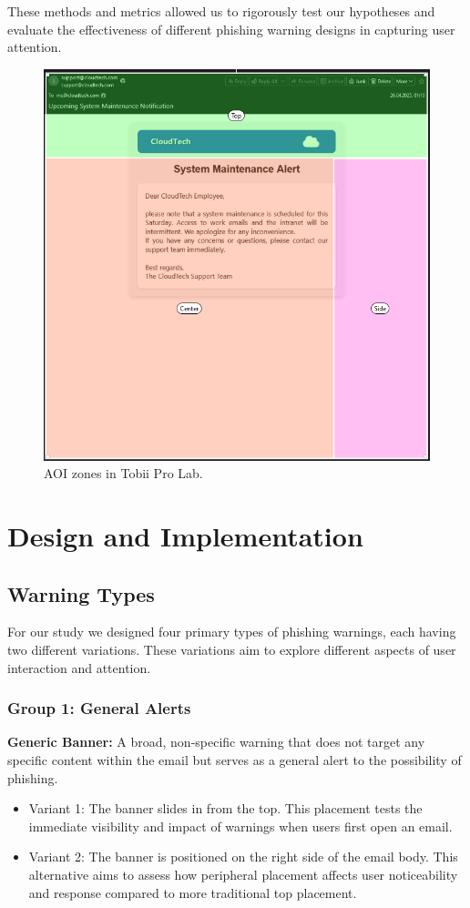 \documentclass[
  a4paper,  %
  twoside,  %
  bibliography=totoc,
  headsepline,
  cleardoublepage=empty,
  parskip=half,
  draft=false
]{scrbook}
\begin{document}
These methods and metrics allowed us to rigorously test our hypotheses and evaluate the effectiveness of different phishing warning designs in capturing user attention.

\begin{figure} [ht]
    \centering
    \includegraphics[width=0.7\linewidth]{figures/aoi.png}
    \caption{AOI zones in Tobii Pro Lab.}
    \label{fig:aoi}
\end{figure}

\chapter{Design and Implementation}
\label{implementation}

\section{Warning Types}
\label{types}
For our study we designed four primary types of phishing warnings, each having two different variations. These variations aim to explore different aspects of user interaction and attention.

\subsection{Group 1: General Alerts}

\textbf{Generic Banner:} A broad, non-specific warning that does not target any specific content within the email but serves as a general alert to the possibility of phishing.

\begin{itemize}
    \item Variant 1: The banner slides in from the top. This placement tests the immediate visibility and impact of warnings when users first open an email. 
    \item Variant 2: The banner is positioned on the right side of the email body. This alternative aims to assess how peripheral placement affects user noticeability and response compared to more traditional top placement.\par
\end{itemize}
\end{document}
